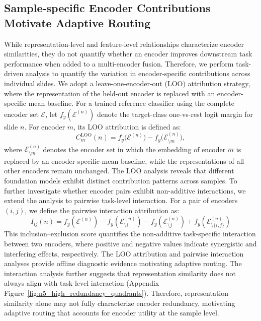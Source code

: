 \subsection{Sample-specific Encoder Contributions Motivate Adaptive Routing}
While representation-level and feature-level relationships characterize encoder similarities, they do not quantify whether an encoder improves downstream task performance when added to a multi-encoder fusion.
Therefore, we perform task-driven analysis to quantify the variation in encoder-specific contributions across individual slides.
We adopt a leave-one-encoder-out (LOO) attribution strategy, where the representation of the held-out encoder is replaced with an encoder-specific mean baseline.
For a trained reference classifier using the complete encoder set \(\mathcal{E}\), let \(f_y(\mathcal{E}^{(n)})\) denote the target-class one-vs-rest logit margin for slide \(n\). 
For encoder \(m\), its LOO attribution is defined as:
\begin{equation}
    C_m^{\mathrm{LOO}}(n)
    =
    f_y\big(\mathcal{E}^{(n)}\big)
    -
    f_y\big(\mathcal{E}_{\setminus m}^{(n)}\big),
\end{equation}
where \(\mathcal{E}_{\setminus m}^{(n)}\) denotes the encoder set in which the embedding of encoder \(m\) is replaced by an encoder-specific mean baseline, while the representations of all other encoders remain unchanged.
The LOO analysis reveals that different foundation models exhibit distinct contribution patterns across samples.
To further investigate whether encoder pairs exhibit non-additive interactions, we extend the analysis to pairwise task-level interaction.
For a pair of encoders $(i,j)$, we define the pairwise interaction attribution as:
\begin{equation}
    I_{ij}(n)
    =
    f_y(\mathcal{E}^{(n)})
    -
    f_y(\mathcal{E}_{\setminus i}^{(n)})
    -
    f_y(\mathcal{E}_{\setminus j}^{(n)})
    +
    f_y(\mathcal{E}_{\setminus \{i,j\}}^{(n)})
\end{equation}
This inclusion--exclusion score quantifies the non-additive task-specific interaction between two encoders, where positive and negative values indicate synergistic and interfering effects, respectively.
The LOO attribution and pairwise interaction analyses provide offline diagnostic evidence motivating adaptive routing.
The interaction analysis further suggests that representation similarity does not always align with task-level interaction (Appendix Figure~\ref{fig:n5_high_redundancy_quadrants}).
Therefore, representation similarity alone may not fully characterize encoder redundancy, motivating adaptive routing that accounts for encoder utility at the sample level.